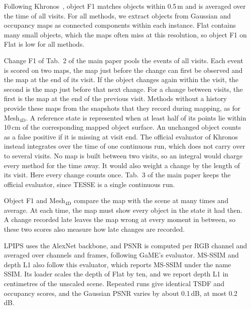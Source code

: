 \documentclass[10pt,onecolumn,letterpaper]{article}
\begin{document}
Following Khronos~\cite{Schmid-RSS-24}, object F1 matches objects within 0.5\,m and is averaged over the time of all visits.
For all methods, we extract objects from Gaussian and occupancy maps as connected components within each instance. Flat contains many small objects, which the maps often miss at this resolution, so object F1 on Flat is low for all methods.

Change F1 of Tab.~2 of the main paper pools the events of all visits. Each event is scored on two maps, the map just before the change can first be observed and the map at the end of its visit. If the object changes again within the visit, the second is the map just before that next change. For a change between visits, the first is the map at the end of the previous visit. Methods without a history provide these maps from the snapshots that they record during mapping, as for Mesh$_{\mathrm{4D}}$. A reference state is represented when at least half of its points lie within 10\,cm of the corresponding mapped object surface. An unchanged object counts as a false positive if it is missing at visit end. The official evaluator of Khronos instead integrates over the time of one continuous run, which does not carry over to several visits. No map is built between two visits, so an integral would charge every method for the time away. It would also weight a change by the length of its visit. Here every change counts once. Tab.~3 of the main paper keeps the official evaluator, since TESSE is a single continuous run.

Object F1 and Mesh$_{\mathrm{4D}}$ compare the map with the scene at many times and average. At each time, the map must show every object in the state it had then. A change recorded late leaves the map wrong at every moment in between, so these two scores also measure how late changes are recorded.

LPIPS uses the AlexNet backbone, and PSNR is computed per RGB channel and averaged over channels and frames, following GaME's evaluator. MS-SSIM and depth L1 also follow this evaluator, which reports MS-SSIM under the name SSIM. Its loader scales the depth of Flat by ten, and we report depth L1 in centimetres of the unscaled scene. Repeated runs give identical TSDF and occupancy scores, and the Gaussian PSNR varies by about 0.1\,dB, at most 0.2\,dB.
\end{document}
